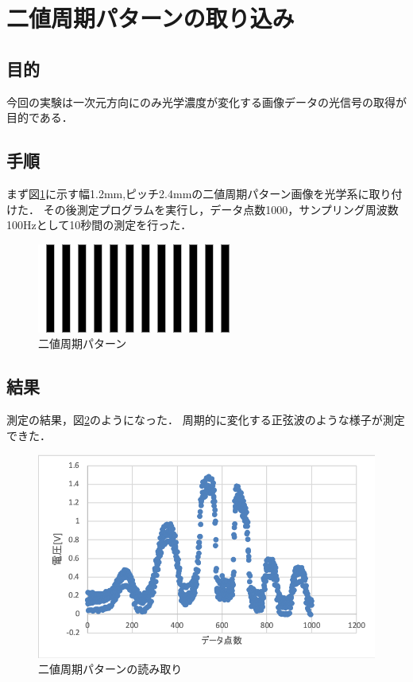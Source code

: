 \documentclass[11pt, a4paper,twocolumn]{jarticle}
\begin{document}
\section{二値周期パターンの取り込み}
\subsection{目的}
今回の実験は一次元方向にのみ光学濃度が変化する画像データの光信号の取得が目的である．

\subsection{手順}
まず図\ref{fig:8}に示す幅1.2mm,ピッチ2.4mmの二値周期パターン画像を光学系に取り付けた．
その後測定プログラムを実行し，データ点数1000，サンプリング周波数100Hzとして10秒間の測定を行った．

\begin{figure}[ht]
 \begin{center}
  \includegraphics[width=0.8\linewidth]{fig8.png}
 \end{center}
 \caption{二値周期パターン}
 \label{fig:8}
\end{figure}

\subsection{結果}
測定の結果，図\ref{fig:9}のようになった．
周期的に変化する正弦波のような様子が測定できた．

\begin{figure}[ht]
 \begin{center}
  \includegraphics[width=0.8\linewidth]{fig9.png}
 \end{center}
 \caption{二値周期パターンの読み取り}
 \label{fig:9}
\end{figure}
\end{document}
